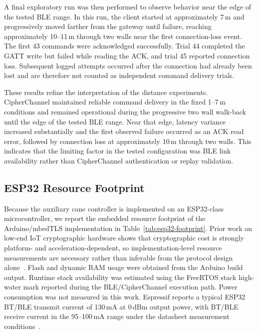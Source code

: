 \documentclass[journal]{IEEEtran}
\begin{document}
A final exploratory run was then performed to observe behavior near the edge of the tested BLE range. In this run, the client started at approximately 7\,m and progressively moved farther from the gateway until failure, reaching approximately 10--11\,m through two walls near the first connection-loss event. The first 43 commands were acknowledged successfully. Trial 44 completed the GATT write but failed while reading the ACK, and trial 45 reported connection loss. Subsequent logged attempts occurred after the connection had already been lost and are therefore not counted as independent command delivery trials.

These results refine the interpretation of the distance experiments. CipherChannel maintained reliable command delivery in the fixed 1--7\,m conditions and remained operational during the progressive two wall walk-back until the edge of the tested BLE range. Near that edge, latency variance increased substantially and the first observed failure occurred as an ACK read error, followed by connection loss at approximately 10\,m through two walls. This indicates that the limiting factor in the tested configuration was BLE link availability rather than CipherChannel authentication or replay validation.

\subsection{ESP32 Resource Footprint}
\label{sec:esp32-footprint}

Because the auxiliary cane controller is implemented on an ESP32-class microcontroller, we report the embedded resource footprint of the Arduino/mbedTLS implementation in Table~\ref{tab:esp32-footprint}. Prior work on low-end IoT cryptographic hardware shows that cryptographic cost is strongly platform- and acceleration-dependent, so implementation-level resource measurements are necessary rather than inferable from the protocol design alone~\cite{kietzmann2021hw}. Flash and dynamic RAM usage were obtained from the Arduino build output. Runtime stack availability was estimated using the FreeRTOS stack high-water mark reported during the BLE/CipherChannel execution path. Power consumption was not measured in this work. Espressif reports a typical ESP32 BT/BLE transmit current of 130\,mA at 0\,dBm output power, with BT/BLE receive current in the 95--100\,mA range under the datasheet measurement conditions~\cite{esp32_datasheet}.
\end{document}
